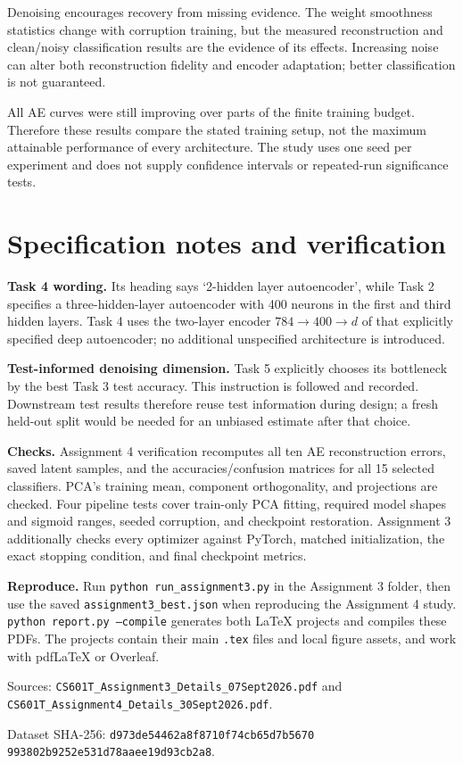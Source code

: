 \documentclass[11pt,a4paper]{article}
\begin{document}
Denoising encourages recovery from missing evidence. The weight smoothness statistics change with corruption training, but the measured reconstruction and clean/noisy classification results are the evidence of its effects. Increasing noise can alter both reconstruction fidelity and encoder adaptation; better classification is not guaranteed.


All AE curves were still improving over parts of the finite training budget. Therefore these results compare the stated training setup, not the maximum attainable performance of every architecture. The study uses one seed per experiment and does not supply confidence intervals or repeated-run significance tests.


\clearpage

\section{Specification notes and verification}

\textbf{Task 4 wording.} Its heading says `2-hidden layer autoencoder', while Task 2 specifies a three-hidden-layer autoencoder with 400 neurons in the first and third hidden layers. Task 4 uses the two-layer encoder $784\to400\to d$ of that explicitly specified deep autoencoder; no additional unspecified architecture is introduced.


\textbf{Test-informed denoising dimension.} Task 5 explicitly chooses its bottleneck by the best Task 3 test accuracy. This instruction is followed and recorded. Downstream test results therefore reuse test information during design; a fresh held-out split would be needed for an unbiased estimate after that choice.


\textbf{Checks.} Assignment 4 verification recomputes all ten AE reconstruction errors, saved latent samples, and the accuracies/confusion matrices for all 15 selected classifiers. PCA's training mean, component orthogonality, and projections are checked. Four pipeline tests cover train-only PCA fitting, required model shapes and sigmoid ranges, seeded corruption, and checkpoint restoration. Assignment 3 additionally checks every optimizer against PyTorch, matched initialization, the exact stopping condition, and final checkpoint metrics.


\textbf{Reproduce.} Run \texttt{python run\_assignment3.py} in the Assignment 3 folder, then use the saved \texttt{assignment3\_best.json} when reproducing the Assignment 4 study. \texttt{python report.py --compile} generates both LaTeX projects and compiles these PDFs. The projects contain their main \texttt{.tex} files and local figure assets, and work with pdfLaTeX or Overleaf.


Sources: \nolinkurl{CS601T_Assignment3_Details_07Sept2026.pdf} and \nolinkurl{CS601T_Assignment4_Details_30Sept2026.pdf}.


Dataset SHA-256: \texttt{d973de54462a8f8710f74cb65d7b5670}\\ \texttt{993802b9252e531d78aaee19d93cb2a8}.
\end{document}
